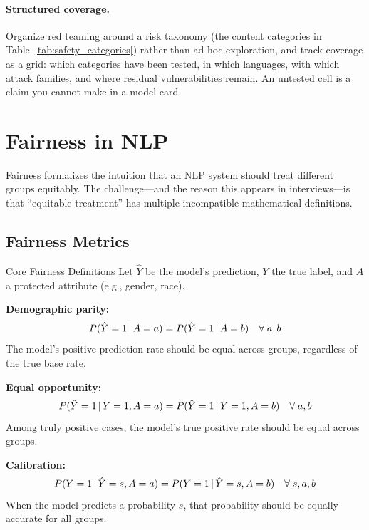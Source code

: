 \paragraph{Structured coverage.}
Organize red teaming around a risk taxonomy (the content categories in
Table~\ref{tab:safety_categories}) rather than ad-hoc exploration, and track
coverage as a grid: which categories have been tested, in which languages,
with which attack families, and where residual vulnerabilities remain.  An
untested cell is a claim you cannot make in a model card.

\section{Fairness in NLP}
\label{sec:fairness}

Fairness formalizes the intuition that an NLP system should treat different
groups equitably.  The challenge---and the reason this appears in interviews---is
that ``equitable treatment'' has multiple incompatible mathematical definitions.

\subsection{Fairness Metrics}

\begin{mathresult}{Core Fairness Definitions}
Let $\hat{Y}$ be the model's prediction, $Y$ the true label, and $A$ a
protected attribute (e.g., gender, race).

\textbf{Demographic parity:}
\[
    P(\hat{Y} = 1 \,|\, A = a) = P(\hat{Y} = 1 \,|\, A = b)
    \quad \forall\; a, b
\]
The model's positive prediction rate should be equal across groups,
regardless of the true base rate.

\textbf{Equal opportunity:}
\[
    P(\hat{Y} = 1 \,|\, Y = 1, A = a) = P(\hat{Y} = 1 \,|\, Y = 1, A = b)
    \quad \forall\; a, b
\]
Among truly positive cases, the model's true positive rate should be equal
across groups.

\textbf{Calibration:}
\[
    P(Y = 1 \,|\, \hat{Y} = s, A = a) = P(Y = 1 \,|\, \hat{Y} = s, A = b)
    \quad \forall\; s, a, b
\]
When the model predicts a probability $s$, that probability should be
equally accurate for all groups.
\end{mathresult}

